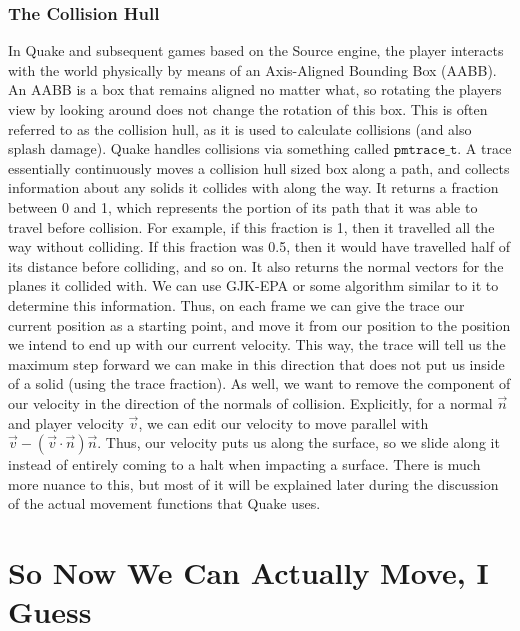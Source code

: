 \documentclass{article}
\begin{document}
\section{The Collision Hull}
In Quake and subsequent games based on the Source engine, the player interacts with the world physically by means of an Axis-Aligned Bounding Box (AABB). An AABB is a box that remains aligned no matter what, so rotating the players view by looking around does not change the rotation of this box. This is often referred to as the collision hull, as it is used to calculate collisions (and also splash damage). Quake handles collisions via something called $\texttt{pmtrace\_t}$. A trace essentially continuously moves a collision hull sized box along a path, and collects information about any solids it collides with along the way. It returns a fraction between 0 and 1, which represents the portion of its path that it was able to travel before collision. For example, if this fraction is 1, then it travelled all the way without colliding. If this fraction was 0.5, then it would have travelled half of its distance before colliding, and so on. It also returns the normal vectors for the planes it collided with. We can use GJK-EPA or some algorithm similar to it to determine this information. Thus, on each frame we can give the trace our current position as a starting point, and move it from our position to the position we intend to end up with our current velocity. This way, the trace will tell us the maximum step forward we can make in this direction that does not put us inside of a solid (using the trace fraction). As well, we want to remove the component of our velocity in the direction of the normals of collision. Explicitly, for a normal $\vec{n}$ and player velocity $\vec{v}$, we can edit our velocity to move parallel with $\vec{v} - (\vec{v}\cdot\vec{n})\vec{n}$. Thus, our velocity puts us along the surface, so we slide along it instead of entirely coming to a halt when impacting a surface. There is much more nuance to this, but most of it will be explained later during the discussion of the actual movement functions that Quake uses. 
\newpage
\part{So Now We Can Actually Move, I Guess}
\end{document}
